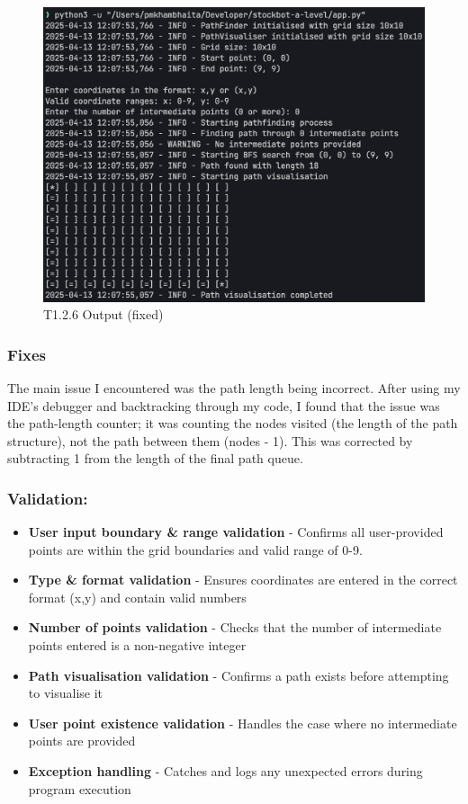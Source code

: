 \begin{figure}[htbp!]
    \centering
    \includegraphics[width=0.5\linewidth]{Images/t1.2.1.png}
    \caption{T1.2.6 Output (fixed)}
    \label{fig:enter-label}
\end{figure}

\newpage

\subsubsection{Fixes}

The main issue I encountered was the path length being incorrect. After using my IDE's debugger and backtracking through my code, I found that the issue was the path-length counter; it was counting the nodes visited (the length of the path structure), not the path between them (nodes - 1). This was corrected by subtracting 1 from the length of the final path queue.

\subsubsection{Validation:}
\begin{itemize}
    \item \textbf{User input boundary \& range validation} - Confirms all user-provided points are within the grid boundaries and valid range of 0-9.
    \item \textbf{Type \& format validation} - Ensures coordinates are entered in the correct format (x,y) and contain valid numbers
    \item \textbf{Number of points validation} - Checks that the number of intermediate points entered is a non-negative integer
    \item \textbf{Path visualisation validation} - Confirms a path exists before attempting to visualise it
    \item \textbf{User point existence validation} - Handles the case where no intermediate points are provided
    \item \textbf{Exception handling} - Catches and logs any unexpected errors during program execution
\end{itemize}


